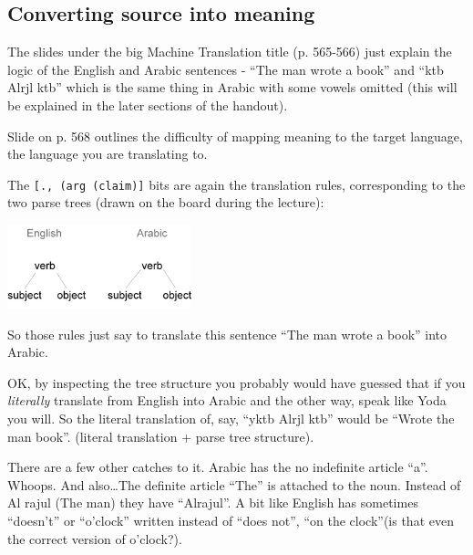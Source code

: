 


\subsection{Converting source into meaning}
 The slides under the big Machine Translation title (p. 565-566) just 
 explain the logic of the English and Arabic sentences - ``The man wrote a 
 book'' and ``ktb Alrjl ktb'' which is the same thing in Arabic with some vowels
  omitted (this will be explained in the later sections of the handout).

Slide on p. 568 outlines the difficulty of mapping meaning to the target 
language, the language you are translating to.

The \texttt{[., (arg (claim)]} bits  are again the translation
 rules, corresponding to the two parse trees (drawn on the board during the 
 lecture):

\begin{center}
  \includegraphics[width=0.4\textwidth]{images/mt-parse-trees.jpg}
\end{center}

So those rules just say to translate this sentence ``The man wrote a book'' into
Arabic.

OK, by inspecting the tree structure you probably would have guessed that if you
\textit{literally} translate from English into Arabic and the other way, speak 
like Yoda you will.   So the literal translation of, say, ``yktb 
Alrjl ktb'' would be ``Wrote the man book''. (literal translation + parse tree 
structure).

There are a few other catches to it. Arabic has the no indefinite article ``a''.
 Whoops. And also\ldots The definite article ``The'' is attached to the noun. 
 Instead of Al rajul (The man) they have ``Alrajul''. A bit like English has 
 sometimes ``doesn't'' or ``o'clock'' written instead of ``does not'', 
 ``on the clock''(is that even the correct version of o'clock?).

